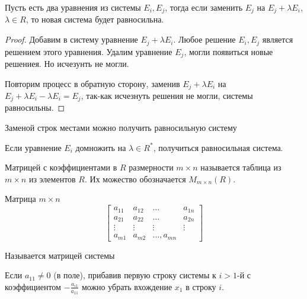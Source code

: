 \begin{lemma} \thmslashn 

Пусть есть два уравнения из системы $E_{i}, E_{j}$, тогда если заменить $E_{j}$ на $E_{j} + \lambda E_{i}$, $\lambda\in R$, то новая система будет равносильна.
\begin{proof}
    Добавим в систему уравнение $E_{j} + \lambda E_{i}$. Любое решение $E_{i}, E_{j}$ является решением этого уравнения. Удалим уравнение $E_{j}$, могли появиться новые решениея. Но исчезунть не могли.

    Повторим процесс в обратную сторону, заменив $E_{j} + \lambda E_{i}$ на $E_{j} + \lambda E_{i} -\lambda E_{i} = E_{j}$, так-как исчезнуть решения не могли, системы равносильны.
\end{proof}
\end{lemma}
\begin{lemma} \thmslashn

    Заменой строк местами можно получить равносильную систему
\end{lemma}
\begin{lemma} \thmslashn

    Если уравнение $E_{i}$ домножить на $\lambda\in R^{*}$, получиться равносильная система.
\end{lemma}
\begin{definition} \thmslashn 

    Матрицей с коэффициентами в $R$ размерности $m \times n$  называется таблица из $m \times n$ из элементов $R$. Их можество обозначается $M_{m \times n}(R)$.
\end{definition}
\begin{definition} \thmslashn 

Матрица $m \times n$ 
\begin{equation*}
    \begin{bmatrix} 
        a_{11}& a_{12}& \ldots& a_{1n}\\
        a_{21}& a_{22}& \ldots& a_{2n}\\
        \vdots& \vdots& \vdots& \vdots\\
        a_{m1}& a_{m2}& \ldots, a_{mn}
    \end{bmatrix} 
\end{equation*}

Называется матрицей системы
\end{definition}

    Если $a_{11} \neq 0$ (в поле), прибавив первую строку системы к $i>1$-й с коэффициентом $- \frac{a_{i1}}{a_{11}}$ можно убрать вхождение $x_1$ в строку $i$.

